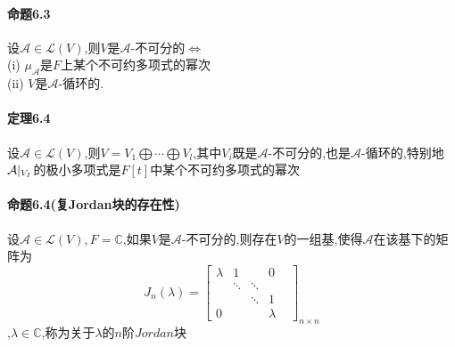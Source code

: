 \documentclass{ctexart}
\begin{document}
\paragraph{命题6.3}
设$\mathcal{A} \in \mathcal{L}(V)$,则$V$是$\mathcal{A}$-不可分的$\Leftrightarrow$\\
(i) $\mu_{\mathcal{A}}$是$F$上某个不可约多项式的幂次\\
(ii) $V$是$\mathcal{A}$-循环的.

\paragraph{定理6.4}
设$\mathcal{A} \in \mathcal{L}(V)$,则$V=V_{1}\bigoplus \cdots \bigoplus V_{l}$,其中$V_{i}$既是$\mathcal{A}$-不可分的,也是$\mathcal{A}$-循环的,特别地$\mathcal{A} \arrowvert_{V_{I}}$的极小多项式是$F[t]$中某个不可约多项式的幂次

\paragraph{命题6.4(复Jordan块的存在性)}
设$\mathcal{A} \in \mathcal{L}(V),F=\mathbb{C}$,如果$V$是$\mathcal{A}$-不可分的,则存在$V$的一组基,使得$\mathcal{A}$在该基下的矩阵为
$$
 J_{n}(\lambda)=
 \left[
 \begin{matrix}
  \lambda & 1 &   & 0 \\
    & \ddots & \ddots &  \\
     &   & \ddots & 1 &  \\
  0 &   &    & \lambda 
  \end{matrix}
  \right]_{n\times n}
$$,$\lambda \in \mathbb{C}$,称为关于$\lambda$的$n$阶$Jordan$块
\ifx\total\undefined
\end{document}
